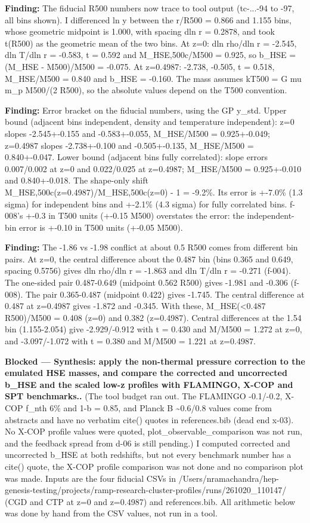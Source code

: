 \documentclass[11pt,a4paper]{article}
\begin{document}
\textbf{Finding:} The fiducial R500 numbers now trace to tool output (tc-...-94 to -97, all bins shown). I differenced ln y between the r/R500 = 0.866 and 1.155 bins, whose geometric midpoint is 1.000, with spacing dln r = 0.2878, and took t(R500) as the geometric mean of the two bins. At z=0: dln rho/dln r = -2.545, dln T/dln r = -0.583, t = 0.592 and M\_HSE,500c/M500 = 0.925, so b\_HSE = (M\_HSE - M500)/M500 = -0.075. At z=0.4987: -2.738, -0.505, t = 0.518, M\_HSE/M500 = 0.840 and b\_HSE = -0.160. The mass assumes kT500 = G mu m\_p M500/(2 R500), so the absolute values depend on the T500 convention.

\textbf{Finding:} Error bracket on the fiducial numbers, using the GP y\_std. Upper bound (adjacent bins independent, density and temperature independent): z=0 slopes -2.545+-0.155 and -0.583+-0.055, M\_HSE/M500 = 0.925+-0.049; z=0.4987 slopes -2.738+-0.100 and -0.505+-0.135, M\_HSE/M500 = 0.840+-0.047. Lower bound (adjacent bins fully correlated): slope errors 0.007/0.002 at z=0 and 0.022/0.025 at z=0.4987; M\_HSE/M500 = 0.925+-0.010 and 0.840+-0.018. The shape-only shift M\_HSE,500c(z=0.4987)/M\_HSE,500c(z=0) - 1 = -9.2\%. Its error is +-7.0\% (1.3 sigma) for independent bins and +-2.1\% (4.3 sigma) for fully correlated bins. f-008's +-0.3 in T500 units (+-0.15 M500) overstates the error: the independent-bin error is +-0.10 in T500 units (+-0.05 M500).

\textbf{Finding:} The -1.86 vs -1.98 conflict at about 0.5 R500 comes from different bin pairs. At z=0, the central difference about the 0.487 bin (bins 0.365 and 0.649, spacing 0.5756) gives dln rho/dln r = -1.863 and dln T/dln r = -0.271 (f-004). The one-sided pair 0.487-0.649 (midpoint 0.562 R500) gives -1.981 and -0.306 (f-008). The pair 0.365-0.487 (midpoint 0.422) gives -1.745. The central difference at 0.487 at z=0.4987 gives -1.872 and -0.345. With these, M\_HSE(\textless{}0.487 R500)/M500 = 0.408 (z=0) and 0.382 (z=0.4987). Central differences at the 1.54 bin (1.155-2.054) give -2.929/-0.912 with t = 0.430 and M/M500 = 1.272 at z=0, and -3.097/-1.072 with t = 0.380 and M/M500 = 1.221 at z=0.4987.

\textbf{Blocked --- Synthesis: apply the non-thermal pressure correction to the emulated HSE masses, and compare the corrected and uncorrected b\_HSE and the scaled low-z profiles with FLAMINGO, X-COP and SPT benchmarks..} (The tool budget ran out. The FLAMINGO -0.1/-0.2, X-COP f\_nth 6\% and 1-b = 0.85, and Planck B \textasciitilde{}0.6/0.8 values come from abstracts and have no verbatim cite() quotes in references.bib (dead end x-03). No X-COP profile values were quoted, plot\_observable\_comparison was not run, and the feedback spread from d-06 is still pending.) I computed corrected and uncorrected b\_HSE at both redshifts, but not every benchmark number has a cite() quote, the X-COP profile comparison was not done and no comparison plot was made. Inputs are the four fiducial CSVs in /Users/nramachandra/hep-genesis-testing/projects/ramp-research-cluster-profiles/runs/261020\_110147/ (CGD and CTP at z=0 and z=0.4987) and references.bib. All arithmetic below was done by hand from the CSV values, not run in a tool.
\end{document}
